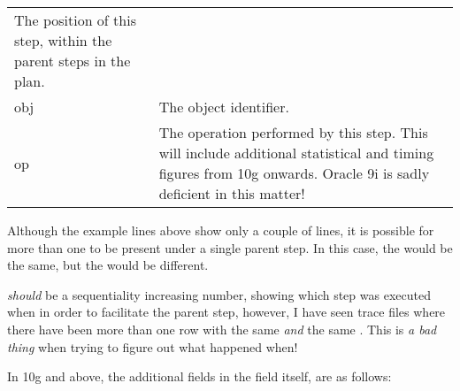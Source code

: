 \begin{longtable}[]{@{}l|l@{}}
\begin{minipage}[t]{0.65\columnwidth}
The position of this step, within the parent steps in the plan.\strut
\end{minipage}\tabularnewline
\begin{minipage}[t]{0.14\columnwidth}\raggedright\strut
obj\strut
\end{minipage} & \begin{minipage}[t]{0.65\columnwidth}\raggedright\strut
The object identifier.\strut
\end{minipage}\tabularnewline
\begin{minipage}[t]{0.14\columnwidth}\raggedright\strut
op\strut
\end{minipage} & \begin{minipage}[t]{0.65\columnwidth}\raggedright\strut
The operation performed by this step. This will include additional
statistical and timing figures from 10g onwards. Oracle 9i is sadly deficient
in this matter!\strut
\end{minipage}\tabularnewline
\bottomrule
\end{longtable}

Although the example  lines above show only a couple of lines, it is possible for more than one to be present under a single parent step. In this case, the  would be the same, but the  would be different.

\begin{warning}
 \emph{should} be a sequentiality increasing number, showing which step was executed when in order to facilitate the parent step, however, I have seen trace files where there have been more than one row with the same  \emph{and} the same . This is \emph{a bad thing} when trying to figure out what happened when!
\end{warning}

In 10g and above, the additional fields in the  field itself, are as follows:


